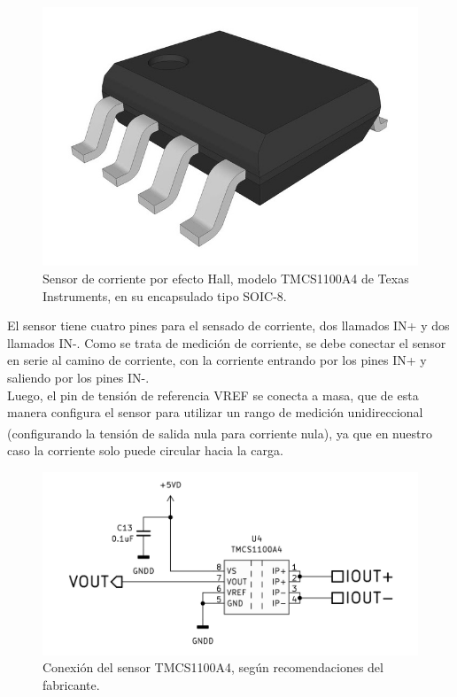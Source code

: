 \begin{figure}[h]
    \centering
    \includegraphics[scale=0.8]{Imagenes/SOIC8.jpg}
    \caption{Sensor de corriente por efecto Hall, modelo TMCS1100A4 de Texas Instruments, en su encapsulado tipo SOIC-8.}
    \label{encapsulado_hall}
\end{figure}

El sensor tiene cuatro pines para el sensado de corriente, dos llamados IN+ y dos llamados IN-. Como se trata de medición de corriente, se debe conectar el sensor en serie al camino de corriente, con la corriente entrando por los pines IN+ y saliendo por los pines IN-.\\

Luego, el pin de tensión de referencia VREF se conecta a masa, que de esta manera configura el sensor para utilizar un rango de medición unidireccional (configurando la tensión de salida nula para corriente nula)\textsuperscript{\cite{TMCS1100}}, ya que en nuestro caso la corriente solo puede circular hacia la carga.\\

\begin{figure}[h]
    \centering
    \includegraphics[scale=1]{Imagenes/Conexion TMCS1100.png}
    \caption{Conexión del sensor TMCS1100A4, según recomendaciones del fabricante.}
    \label{conexion_TMCS1100}
\end{figure}

